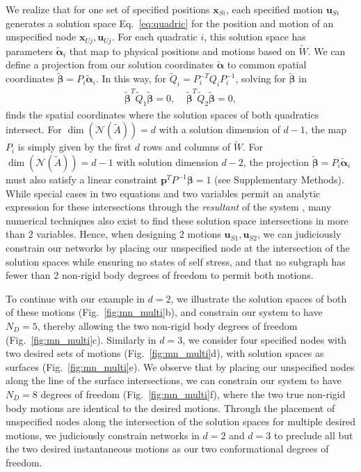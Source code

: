 \documentclass[%
preprint,
 amsmath,amssymb,
 aps,
]{revtex4-1}
\newcommand{\mc}{\mathcal}
\begin{document}
We realize that for one set of specified positions $\bm{x}_{Si}$, each specified motion $\bm{u}_{Si}$ generates a solution space Eq.~\ref{eq:quadric} for the position and motion of an unspecified node $\bm{x}_{Uj}, \bm{u}_{Uj}$. For each quadratic $i$, this solution space has parameters $\bm{\tilde{\alpha}}_i$ that map to physical positions and motions based on $\tilde{W}$. We can define a projection from our solution coordinates $\tilde{\bm{\alpha}}$ to common spatial coordinates $\bm{\tilde{\beta}} = P_i \bm{\tilde{\alpha}}_i$. In this way, for $\tilde{Q}_i = P_i^{-T}Q_iP_i^{-1}$, solving for $\bm{\tilde{\beta}}$ in 
\begin{align}
\label{eq:basis}
\bm{\tilde{\beta}}^T \tilde{Q}_1 \bm{\tilde{\beta}} = 0,~~~~~\bm{\tilde{\beta}}^T \tilde{Q}_2 \bm{\tilde{\beta}} = 0,
\end{align}
finds the spatial coordinates where the solution spaces of both quadratics intersect. For $\dim(\mc N(\tilde{A})) = d$ with a solution dimension of $d-1$, the map $P_i$ is simply given by the first $d$ rows and columns of $\tilde{W}$. For $\dim(\mc{N}(\tilde{A})) = d-1$ with solution dimension $d-2$, the projection $\bm{\tilde{\beta}} = P_i \bm{\tilde{\alpha}}_i$ must also satisfy a linear constraint $\bm{p}^T P^{-1}\bm{\beta} = 1$ (see Supplementary Methods). While special cases in two equations and two variables permit an analytic expression for these intersections through the \emph{resultant} of the system \cite{macaulay1902elimination}, many numerical techniques also exist to find these solution space intersections in more than 2 variables. Hence, when designing 2 motions $\bm{u}_{S1}, \bm{u}_{S2}$, we can judiciously constrain our networks by placing our unspecified node at the intersection of the solution spaces while ensuring no states of self stress, and that no subgraph has fewer than 2 non-rigid body degrees of freedom to permit both motions.

To continue with our example in $d = 2$, we illustrate the solution spaces of both of these motions (Fig.~\ref{fig:mn_multi}b), and constrain our system to have $N_D = 5$, thereby allowing the two non-rigid body degrees of freedom (Fig.~\ref{fig:mn_multi}c). Similarly in $d=3$, we consider four specified nodes with two desired sets of motions (Fig.~\ref{fig:mn_multi}d), with solution spaces as surfaces (Fig.~\ref{fig:mn_multi}e). We observe that by placing our unspecified nodes along the line of the surface intersections, we can constrain our system to have $N_D = 8$ degrees of freedom (Fig.~\ref{fig:mn_multi}f), where the two true non-rigid body motions are identical to the desired motions. Through the placement of unspecified nodes along the intersection of the solution spaces for multiple desired motions, we judiciously constrain networks in $d=2$ and $d=3$ to preclude all but the two desired instantaneous motions as our two conformational degrees of freedom.
\end{document}
